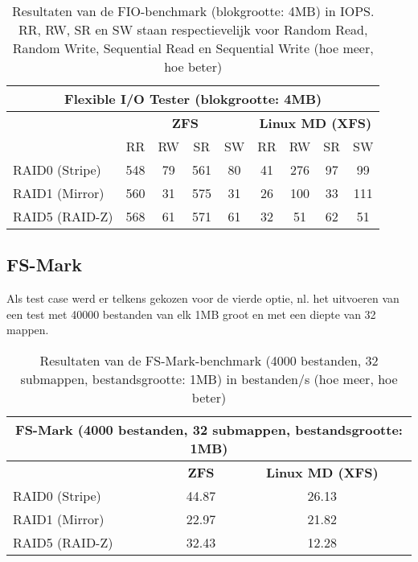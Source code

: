 \begin{table}[h]
  \centering
  \begin{tabular}{l || c c c c | c c c c}
    \hline
    \multicolumn{9}{c}{\textbf{Flexible I/O Tester (blokgrootte: 4MB)}} \\
    \hline
    & \multicolumn{4}{c|}{\textbf{ZFS}} & \multicolumn{4}{|c}{\textbf{Linux MD (XFS)}} \\
    & RR & RW & SR & SW & RR & RW & SR & SW \\
    \hline
    RAID0 (Stripe) & 548 & 79 & 561 & 80 & 41 & 276 & 97 & 99 \\
    RAID1 (Mirror) & 560 & 31 & 575 & 31 & 26 & 100 & 33 & 111 \\
    RAID5 (RAID-Z) & 568 & 61 & 571 & 61 & 32 & 51 & 62 & 51 \\
  \end{tabular}
  \caption{Resultaten van de FIO-benchmark (blokgrootte: 4MB) in IOPS. RR, RW, SR en SW staan respectievelijk voor Random Read, Random Write, Sequential Read en Sequential Write (hoe meer, hoe beter)}
  \label{tab:results_fio_4mb}
\end{table}

\subsection{FS-Mark}

Als test case werd er telkens gekozen voor de vierde optie, nl. het uitvoeren van een test met 40000 bestanden van elk 1MB groot en met een diepte van 32 mappen. 

\begin{table}[h]
  \centering
  \begin{tabular}{l || c | c }
    \hline
    \multicolumn{3}{c}{\textbf{FS-Mark (4000 bestanden, 32 submappen, bestandsgrootte: 1MB)}} \\
    \hline
    & \textbf{ZFS} & \textbf{Linux MD (XFS)} \\
    \hline
    RAID0 (Stripe) & 44.87 & 26.13 \\
    RAID1 (Mirror) & 22.97 & 21.82 \\
    RAID5 (RAID-Z) & 32.43 & 12.28 \\
  \end{tabular}
  \caption{Resultaten van de FS-Mark-benchmark (4000 bestanden, 32 submappen, bestandsgrootte: 1MB) in bestanden/s (hoe meer, hoe beter)}
  \label{tab:results_fmark}
\end{table}



